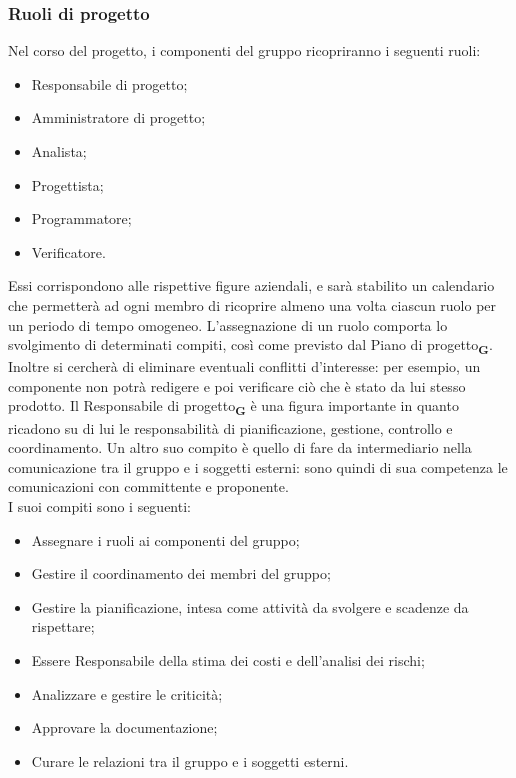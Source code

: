 \subsubsection{Ruoli di progetto}
Nel corso del progetto, i componenti del gruppo ricopriranno i seguenti ruoli:
\begin {itemize}
    \item Responsabile di progetto;
    \item Amministratore di progetto;
    \item Analista;
    \item Progettista;
    \item Programmatore;
    \item Verificatore.
\end {itemize}
Essi corrispondono alle rispettive figure aziendali, e sarà stabilito un calendario che permetterà ad ogni membro di ricoprire almeno una volta ciascun ruolo per un periodo di tempo omogeneo. L’assegnazione di un ruolo comporta lo svolgimento di determinati compiti, così come previsto dal Piano di progetto\textsubscript{\textbf{G}}. Inoltre si cercherà di eliminare eventuali conflitti d'interesse: per esempio, un componente non potrà redigere e poi verificare ciò che è stato da lui stesso prodotto.
Il Responsabile di progetto\textsubscript{\textbf{G}} è una figura importante in quanto ricadono su di lui le responsabilità di pianificazione, gestione, controllo e coordinamento. Un altro suo compito è quello di fare da intermediario nella comunicazione tra il gruppo e i soggetti esterni: sono quindi di sua competenza le comunicazioni con committente e proponente.\\
I suoi compiti sono i seguenti:
\begin {itemize}
    \item Assegnare i ruoli ai componenti del gruppo;
    \item Gestire il coordinamento dei membri del gruppo;
    \item Gestire la pianificazione, intesa come attività da svolgere e scadenze da rispettare;
    \item Essere Responsabile della stima dei costi e dell’analisi dei rischi;
    \item Analizzare e gestire le criticità;
    \item Approvare la documentazione;
    \item Curare le relazioni tra il gruppo e i soggetti esterni.
\end {itemize}
